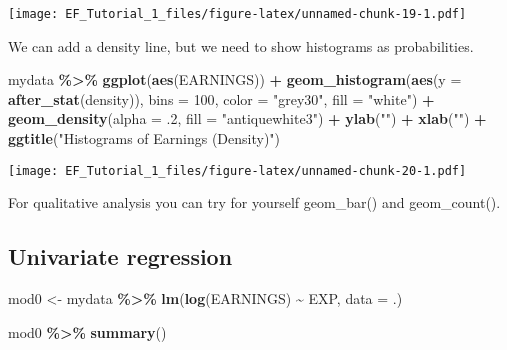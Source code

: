 \documentclass[
]{article}
\newenvironment{Shaded}{\begin{snugshade}}{\end{snugshade}}
\newcommand{\AttributeTok}[1]{\textcolor[rgb]{0.13,0.29,0.53}{#1}}
\newcommand{\DecValTok}[1]{\textcolor[rgb]{0.00,0.00,0.81}{#1}}
\newcommand{\FunctionTok}[1]{\textcolor[rgb]{0.13,0.29,0.53}{\textbf{#1}}}
\newcommand{\NormalTok}[1]{#1}
\newcommand{\OtherTok}[1]{\textcolor[rgb]{0.56,0.35,0.01}{#1}}
\newcommand{\SpecialCharTok}[1]{\textcolor[rgb]{0.81,0.36,0.00}{\textbf{#1}}}
\newcommand{\StringTok}[1]{\textcolor[rgb]{0.31,0.60,0.02}{#1}}
\begin{document}
\texttt{[image: EF\_Tutorial\_1\_files/figure-latex/unnamed-chunk-19-1.pdf]}

We can add a density line, but we need to show histograms as
probabilities.

\begin{Shaded}
\begin{Highlighting}[]
\NormalTok{mydata }\SpecialCharTok{\%\textgreater{}\%} 
  \FunctionTok{ggplot}\NormalTok{(}\FunctionTok{aes}\NormalTok{(EARNINGS)) }\SpecialCharTok{+}
    \FunctionTok{geom\_histogram}\NormalTok{(}\FunctionTok{aes}\NormalTok{(}\AttributeTok{y =} \FunctionTok{after\_stat}\NormalTok{(density)),}
                   \AttributeTok{bins =} \DecValTok{100}\NormalTok{, }
                   \AttributeTok{color =} \StringTok{"grey30"}\NormalTok{, }
                   \AttributeTok{fill =} \StringTok{"white"}\NormalTok{) }\SpecialCharTok{+}
        \FunctionTok{geom\_density}\NormalTok{(}\AttributeTok{alpha =}\NormalTok{ .}\DecValTok{2}\NormalTok{, }
                     \AttributeTok{fill =} \StringTok{"antiquewhite3"}\NormalTok{) }\SpecialCharTok{+}
    \FunctionTok{ylab}\NormalTok{(}\StringTok{""}\NormalTok{) }\SpecialCharTok{+} 
    \FunctionTok{xlab}\NormalTok{(}\StringTok{""}\NormalTok{) }\SpecialCharTok{+}
    \FunctionTok{ggtitle}\NormalTok{(}\StringTok{"Histograms of Earnings (Density)"}\NormalTok{)  }
\end{Highlighting}
\end{Shaded}

\texttt{[image: EF\_Tutorial\_1\_files/figure-latex/unnamed-chunk-20-1.pdf]}

For qualitative analysis you can try for yourself geom\_bar() and
geom\_count().

\hypertarget{univariate-regression}{%
\subsection{Univariate regression}\label{univariate-regression}}

\begin{Shaded}
\begin{Highlighting}[]
\NormalTok{mod0 }\OtherTok{\textless{}{-}}\NormalTok{ mydata }\SpecialCharTok{\%\textgreater{}\%}
  \FunctionTok{lm}\NormalTok{(}\FunctionTok{log}\NormalTok{(EARNINGS) }\SpecialCharTok{\textasciitilde{}}\NormalTok{ EXP, }\AttributeTok{data =}\NormalTok{ .)}
  
\NormalTok{mod0 }\SpecialCharTok{\%\textgreater{}\%} \FunctionTok{summary}\NormalTok{()}
\end{Highlighting}
\end{Shaded}
\end{document}
